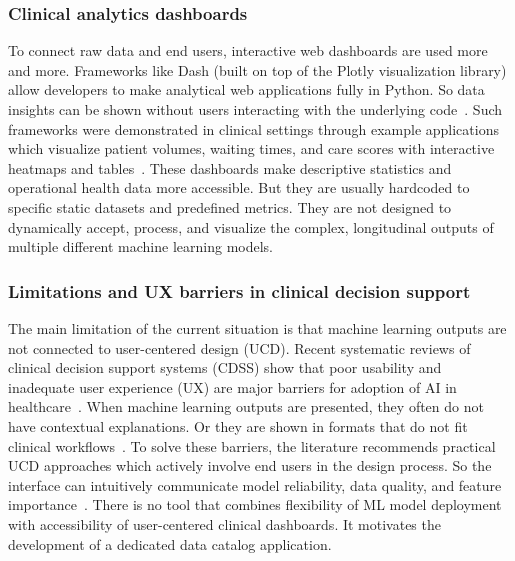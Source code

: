 \subsubsection{Clinical analytics dashboards}
To connect raw data and end users, interactive web dashboards are used more and more. Frameworks like Dash (built on top of the Plotly visualization library) allow developers to make analytical web applications fully in Python. So data insights can be shown without users interacting with the underlying code~\cite{dash_plotly_framework}. Such frameworks were demonstrated in clinical settings through example applications which visualize patient volumes, waiting times, and care scores with interactive heatmaps and tables~\cite{dash_clinical_analytics_plotly}. These dashboards make descriptive statistics and operational health data more accessible. But they are usually hardcoded to specific static datasets and predefined metrics. They are not designed to dynamically accept, process, and visualize the complex, longitudinal outputs of multiple different machine learning models.

\subsubsection{Limitations and UX barriers in clinical decision support}
The main limitation of the current situation is that machine learning outputs are not connected to user-centered design (UCD). Recent systematic reviews of clinical decision support systems (CDSS) show that poor usability and inadequate user experience (UX) are major barriers for adoption of AI in healthcare~\cite{pubmed_40540451}. When machine learning outputs are presented, they often do not have contextual explanations. Or they are shown in formats that do not fit clinical workflows~\cite{jamia_bias_ui_2025}. To solve these barriers, the literature recommends practical UCD approaches which actively involve end users in the design process. So the interface can intuitively communicate model reliability, data quality, and feature importance~\cite{pubmed_40540451}. There is no tool that combines flexibility of ML model deployment with accessibility of user-centered clinical dashboards. It motivates the development of a dedicated data catalog application.

